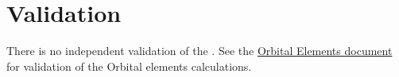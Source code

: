 %
%
% 
%

\section{Validation}


There is no independent validation of the \OrbElemDesc.  See the 
\href{file:\JEODHOME/models/utils/orbital_elements/docs/orbital_elements.pdf}{Orbital Elements document}~\cite{dynenv:ORBITALELEMENTS} for validation of the Orbital elements calculations.